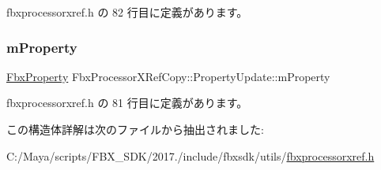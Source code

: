  fbxprocessorxref.\+h の 82 行目に定義があります。

\mbox{\label{struct_fbx_processor_x_ref_copy_1_1_property_update_a2e5c002f72c067c846ff3bf653273edf}} 
\subsubsection{\texorpdfstring{m\+Property}{mProperty}}
{\footnotesize\ttfamily \hyperlink{class_fbx_property}{Fbx\+Property} Fbx\+Processor\+X\+Ref\+Copy\+::\+Property\+Update\+::m\+Property}



 fbxprocessorxref.\+h の 81 行目に定義があります。



この構造体詳解は次のファイルから抽出されました\+:\begin{DoxyCompactItemize}
\item 
C\+:/\+Maya/scripts/\+F\+B\+X\+\_\+\+S\+D\+K/2017./include/fbxsdk/utils/\hyperlink{fbxprocessorxref_8h}{fbxprocessorxref.\+h}\end{DoxyCompactItemize}

